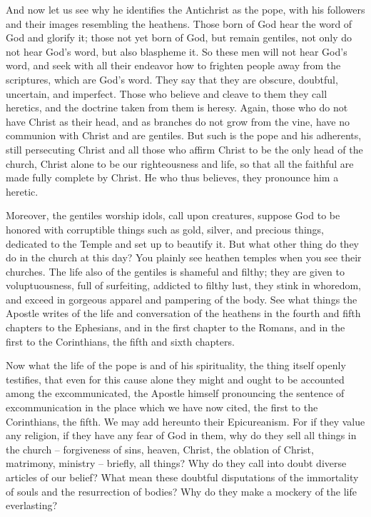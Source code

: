 And now let us see why he identifies the Antichrist as the pope, with his followers and their images resembling the heathens. Those born of God hear the word of God and glorify it; those not yet born of God, but remain gentiles, not only do not hear God’s word, but also blaspheme it. So these men will not hear God’s word, and seek with all their endeavor how to frighten people away from the scriptures, which are God’s word. They say that they are obscure, doubtful, uncertain, and imperfect. Those who believe and cleave to them they call heretics, and the doctrine taken from them is heresy. Again, those who do not have Christ as their head, and as branches do not grow from the vine, have no communion with Christ and are gentiles. But such is the pope and his adherents, still persecuting Christ and all those who affirm Christ to be the only head of the church, Christ alone to be our righteousness and life, so that all the faithful are made fully complete by Christ. He who thus believes, they pronounce him a heretic.

Moreover, the gentiles worship idols, call upon creatures, suppose God to be honored with corruptible things such as gold, silver, and precious things, dedicated to the Temple and set up to beautify it. But what other thing do they do in the church at this day? You plainly see heathen temples when you see their churches. The life also of the gentiles is shameful and filthy; they are given to voluptuousness, full of surfeiting, addicted to filthy lust, they stink in whoredom, and exceed in gorgeous apparel and pampering of the body. See what things the Apostle writes of the life and conversation of the heathens in the fourth and fifth chapters to the Ephesians, and in the first chapter to the Romans, and in the first to the Corinthians, the fifth and sixth chapters.

Now what the life of the pope is and of his spirituality, the thing itself openly testifies, that even for this cause alone they might and ought to be accounted among the excommunicated, the Apostle himself pronouncing the sentence of excommunication in the place which we have now cited, the first to the Corinthians, the fifth. We may add hereunto their Epicureanism. For if they value any religion, if they have any fear of God in them, why do they sell all things in the church – forgiveness of sins, heaven, Christ, the oblation of Christ, matrimony, ministry – briefly, all things? Why do they call into doubt diverse articles of our belief? What mean these doubtful disputations of the immortality of souls and the resurrection of bodies? Why do they make a mockery of the life everlasting?

